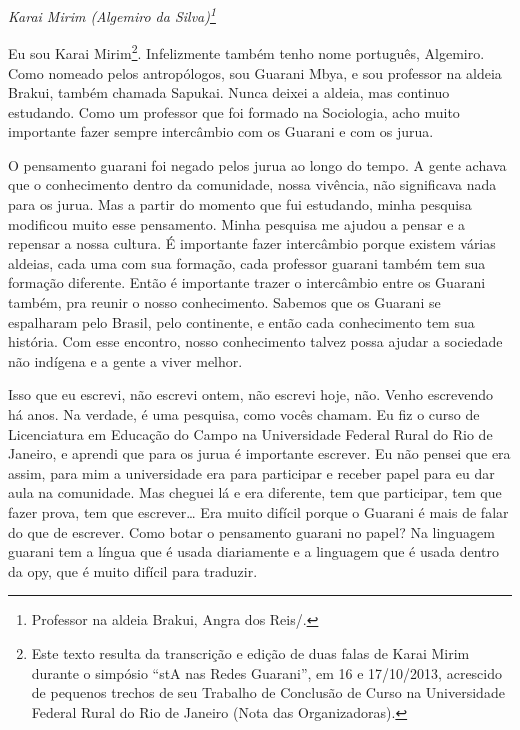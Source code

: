\begin{flushright}
\emph{Karai Mirim (Algemiro da Silva)\footnote{Professor na aldeia Brakui,
Angra dos Reis/.}}
\end{flushright} 

Eu sou Karai Mirim\footnote{Este texto resulta da transcrição e edição
de duas falas de Karai Mirim durante o simpósio ``stA nas Redes
Guarani'', em 16 e 17/10/2013, acrescido de pequenos trechos de seu
Trabalho de Conclusão de Curso na Universidade Federal Rural do Rio de
Janeiro (Nota das Organizadoras).}. Infelizmente também tenho nome
português, Algemiro. Como nomeado pelos antropólogos, sou Guarani Mbya,
e sou professor na aldeia Brakui, também chamada Sapukai. Nunca deixei
a aldeia, mas continuo estudando. Como um professor que foi formado na
Sociologia, acho muito importante fazer sempre intercâmbio com os
Guarani e com os jurua.

O pensamento guarani foi negado pelos jurua ao longo do tempo. A gente
achava que o conhecimento dentro da comunidade, nossa vivência, não
significava nada para os jurua. Mas a partir do momento que fui
estudando, minha pesquisa modificou muito esse pensamento. Minha
pesquisa me ajudou a pensar e a repensar a nossa cultura. É importante
fazer intercâmbio porque existem várias aldeias, cada uma com sua
formação, cada professor guarani também tem sua formação diferente.
Então é importante trazer o intercâmbio entre os Guarani também, pra
reunir o nosso conhecimento. Sabemos que os Guarani se espalharam pelo
Brasil, pelo continente, e então cada conhecimento tem sua história.
Com esse encontro, nosso conhecimento talvez possa ajudar a sociedade
não indígena e a gente a viver melhor.

Isso que eu escrevi, não escrevi ontem, não escrevi hoje, não. Venho
escrevendo há anos. Na verdade, é uma pesquisa, como vocês chamam. Eu
fiz o curso de Licenciatura em Educação do Campo na Universidade
Federal Rural do Rio de Janeiro, e aprendi que para os jurua é
importante escrever. Eu não pensei que era assim, para mim a
universidade era para participar e receber papel para eu dar aula na
comunidade. Mas cheguei lá e era diferente, tem que participar, tem que
fazer prova, tem que escrever\ldots{} Era muito difícil porque o Guarani é
mais de falar do que de escrever. Como botar o pensamento guarani no
papel? Na linguagem guarani tem a língua que é usada diariamente e a
linguagem que é usada dentro da opy, que é muito difícil para traduzir.

